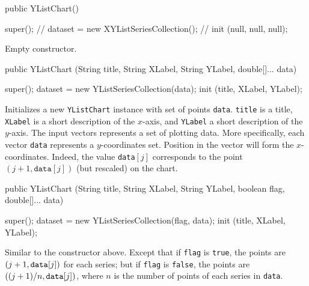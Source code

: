 \begin{code}

   public YListChart() \begin{hide} {
      super();
      // dataset = new XYListSeriesCollection();
      // init (null, null, null);
   }\end{hide}
\end{code}
\begin{tabb}
   Empty constructor.
\end{tabb}
\begin{code}

   public YListChart (String title, String XLabel, String YLabel,
                      double[]... data) \begin{hide} {
      super();
      dataset = new YListSeriesCollection(data);
      init (title, XLabel, YLabel);
   }\end{hide}
\end{code}
\begin{tabb}
   Initializes a new \texttt{YListChart} instance with set of points \texttt{data}.
   \texttt{title} is a title, \texttt{XLabel} is a short description of
   the $x$-axis, and \texttt{YLabel}  a short description of the $y$-axis.
   The input vectors represents a set of plotting data. More specifically,
   each vector \texttt{data} represents a $y$-coordinates set.
   Position in the vector will form the $x$-coordinates.
   Indeed, the value \texttt{data}$[j]$ corresponds to the point
   $(j+1, \texttt{data}[j])$ (but rescaled) on the chart.
\end{tabb}
\begin{htmlonly}
\end{htmlonly}
\begin{code}

   public YListChart (String title, String XLabel, String YLabel,
                      boolean flag, double[]... data) \begin{hide} {
      super();
      dataset = new YListSeriesCollection(flag, data);
      init (title, XLabel, YLabel);
   }\end{hide}
\end{code}
\begin{tabb}
   Similar to the constructor %
  above.  %
     Except that if \texttt{flag} is \texttt{true}, the points are
 $(j+1, \mbox{\texttt{data}}[j])$ for each series;
  but if \texttt{flag} is \texttt{false},
  the points are $((j+1)/n, \mbox{\texttt{data}}[j])$, where $n$ is
  the number of points of each series in \texttt{data}.
\end{tabb}

